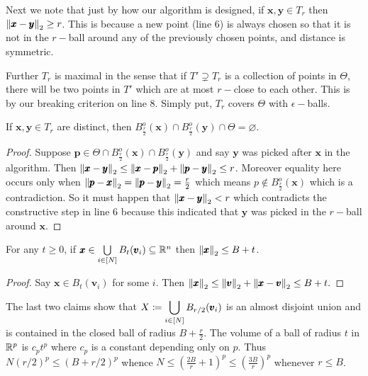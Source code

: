 Next we note that just by how our algorithm is designed, if $\pmb x,\pmb y\in T_{r}$ then $\left\lVert \pmb x-\pmb y \right\rVert_{2}\ge r$. This is because a new point (line $6$) is always chosen so that it is not in the $r-$ball around any of the previously chosen points, and distance is symmetric.

Further $T_{r}$ is maximal in the sense that if $T'\supsetneq T_{r}$ is a collection of points in $\Theta$, there will be two points in $T'$ which are at most $r-$close to each other. This is by our breaking criterion on line $8$. Simply put, $T_{r}$ covers $\Theta$ with $\epsilon-$balls.

\begin{cl}\label{disj}
If $\pmb x,\pmb y\in T_{r}$ are distinct, then $B_{\frac{r}{2}}^{o}(\pmb x)\cap B_{\frac{r}{2}}^{o}(\pmb y) \cap \Theta = \varnothing$.
\end{cl}
\begin{proof}
Suppose $\pmb p\in \Theta\cap B_{\frac{r}{2}}^{o}(\pmb x)\cap B_{\frac{r}{2}}^{o}(\pmb y)$ and say $\pmb y$ was picked after $\pmb x$ in the algorithm. Then $\left\lVert \pmb x-\pmb y \right\rVert_{2}\le \left\lVert \pmb x-\pmb p \right\rVert_{2} + \left\lVert \pmb p-\pmb y \right\rVert_{2} \le r$. Moreover equality here occurs only when $\left\lVert \pmb p-\pmb x \right\rVert_{2} = \left\lVert \pmb p-\pmb y \right\rVert_{2}=\frac{r}{2}$ which means $p\notin B_{\frac r2}^{o}(\pmb x)$ which is a contradiction. So it must happen that $\left\lVert \pmb x-\pmb y \right\rVert_{2}<r$ which contradicts the constructive step in line $6$ because this indicated that $\pmb y$ was picked in the $r-$ball around $\pmb x$.
\end{proof}

\begin{cl}\label{ball}
For any $t\ge 0$, if $\pmb x\in \bigcup\limits_{i\in [N]}B_{t}(\pmb v_{i})\subseteq \mathbb{R}^{n}$ then $\left\lVert \pmb x \right\rVert_{2}\le B+t$.
\end{cl}
\begin{proof}
Say $\pmb x\in B_{t}(\pmb v_{i})$ for some $i$. Then 
$\left\lVert \pmb x \right\rVert_{2} \le \left\lVert \pmb v \right\rVert_{2} + \left\lVert \pmb x-\pmb v \right\rVert_{2} \le B+t.$
\end{proof}

The last two claims show that $\displaystyle X\coloneqq\bigcup\limits_{i\in [N]}B_{r/2}(\pmb v_{i})$ is an almost disjoint union and is contained in the closed ball of radius $B+\frac r2$. The volume of a ball of radius $t$ in $\mathbb{R}^{p}$ is $c_{p}t^{p}$ where $c_{p}$ is a constant depending only on $p$. Thus $N(r/2)^{p} \le (B+r/2)^{p}$ whence $N\le \left(\frac{2B}{r}+1\right)^{p} \le \left(\frac{3B}{r}\right)^{p}$ whenever $r\le B$.









\nocite{*}
\printbibliography



















